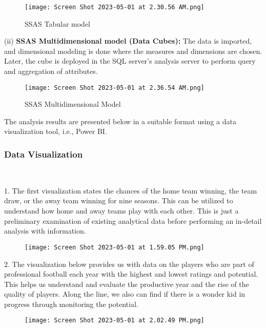 \documentclass[lettersize]{IEEEtran}
\begin{document}
\begin{figure}[H]
    \centering
    \texttt{[image: Screen Shot 2023-05-01 at 2.30.56 AM.png]}
    \caption{SSAS Tabular model}
    \label{fig:image_label}
\end{figure}

(ii) \textbf{SSAS Multidimensional model (Data Cubes):} The data is imported, and dimensional modeling is done where the measures and dimensions are chosen. Later, the cube is deployed in the SQL server's analysis server to perform query and aggregation of attributes.

\begin{figure}[H]
    \centering
    \texttt{[image: Screen Shot 2023-05-01 at 2.36.54 AM.png]}
    \caption{SSAS Multidimensional Model}
    \label{fig:image_label}
\end{figure}

The analysis results are presented below in a suitable format using a data visualization tool, i.e., Power BI.

\vspace{1em}
\subsubsection{\textbf{Data Visualization}}\
\

\vspace{0.5em}1. The first visualization states the chances of the home team winning, the team draw, or the away team winning for nine seasons. This can be utilized to understand how home and away teams play with each other. This is just a preliminary examination of existing analytical data before performing an in-detail analysis with information. 
\begin{figure}[H]
    \centering
    \texttt{[image: Screen Shot 2023-05-01 at 1.59.05 PM.png]}
\end{figure}

2. The visualization below provides us with data on the players who are part of professional football each year with the highest and lowest ratings and potential. This helps us understand and evaluate the productive year and the rise of the quality of players. Along the line, we also can find if there is a wonder kid in progress through monitoring the potential.
\vspace{-2\baselineskip}
\begin{figure}[H]
    \centering
    \texttt{[image: Screen Shot 2023-05-01 at 2.02.49 PM.png]}
\end{figure}
\end{document}
